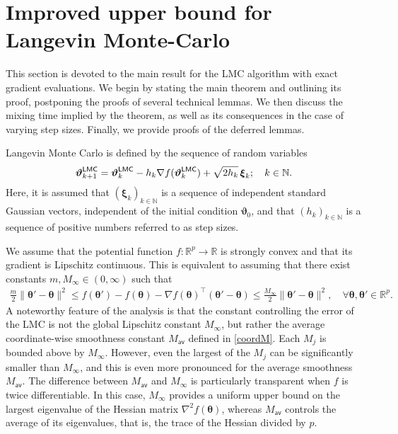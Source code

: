 \documentclass[aos,reqno]{imsart}
\newcommand\bxi{\boldsymbol\xi}
\newcommand\btheta{\boldsymbol\theta}
\newcommand\bvartheta{\boldsymbol\vartheta}
\def\Mav{M_{\textsf{av}}}
\def\Mmax{M_{\infty}}
\theoremstyle{definition}
\begin{document}
\section{Improved upper bound for Langevin Monte-Carlo}
\label{Sec:LMC}

This section is devoted to the main result for the LMC
algorithm with exact gradient evaluations. We begin by 
stating the main theorem and outlining its proof,
postponing the proofs of several technical lemmas.  
We then  discuss the mixing time implied by the 
theorem, as well as its consequences in the case 
of varying step sizes. Finally, 
we provide proofs of the deferred lemmas. 

Langevin Monte Carlo is defined by the
sequence of random variables 
\begin{align}\label{LMC}
    \bvartheta_{k+1}^{\sf LMC} = \bvartheta_{k}^{\sf LMC} 
    - h_k \nabla f(\bvartheta_{k}^{\sf LMC})  + 
    \sqrt{2h_k}\,\bxi_k;\quad k\in\mathbb N.
\end{align}
Here, it is assumed that $(\bxi_k)_{k\in\mathbb N}$
is a sequence of independent standard Gaussian vectors,
independent of the initial condition $\bvartheta_0$, and 
that $(h_k)_{k\in\mathbb N}$ is a sequence of positive 
numbers referred to as step sizes. 

We assume that the potential function $f:\mathbb R^p\to
\mathbb R$ is strongly convex and that its gradient is
Lipschitz continuous. This is equivalent to assuming that
there exist constants $m,\Mmax\in (0,\infty)$ such that
\begin{align}\label{Lip:1}
    \frac{m}{2}\|\btheta' - \btheta\|^2\leqslant 
    f(\btheta') - f(\btheta) - \nabla f(\btheta)^\top 
    (\btheta' - \btheta)
    \leqslant \frac{\Mmax}{2}\|\btheta' - \btheta\|^2,\quad
    \forall \btheta,\btheta'\in \mathbb R^p.
\end{align}
A noteworthy feature of the analysis is that the constant
controlling the error of the LMC is not the global Lipschitz 
constant $\Mmax$, but rather the average coordinate-wise
smoothness constant $\Mav$ defined in \eqref{coordM}. Each
$M_j$ is bounded above by $\Mmax$. However, even the largest
of the $M_j$ can be significantly smaller than $\Mmax$, and this
is even more pronounced for the average smoothness $\Mav$. 
The difference between $\Mav$ and $\Mmax$ is particularly 
transparent when $f$ is twice differentiable. In this case,
$\Mmax$ provides a uniform upper bound on the largest eigenvalue 
of the Hessian matrix $\nabla^2 f(\btheta)$, whereas $\Mav$ 
controls the average of its eigenvalues, that is, the trace 
of the Hessian divided by $p$.
\end{document}
